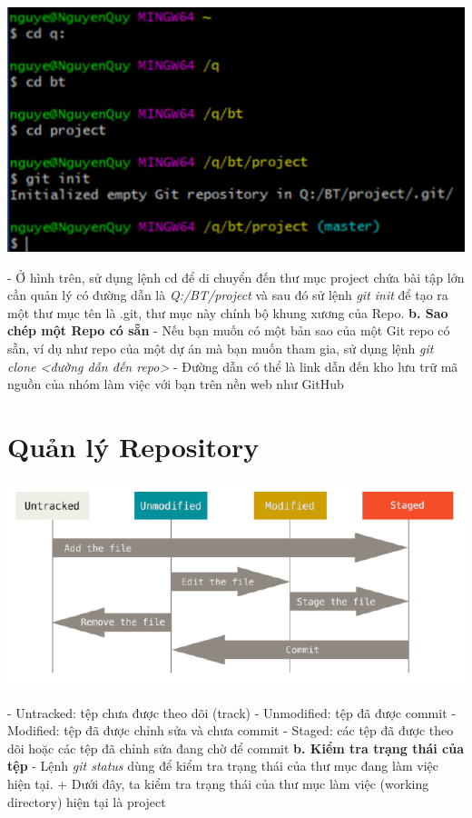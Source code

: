 \documentclass[12pt,a4paper]{report}
\begin{document}
	\includegraphics[width=0.8\linewidth]{screenshot005}

	\label{fig:screenshot005}
\vskip 0.4cm\vskip 0.4cm

- Ở hình trên, sử dụng lệnh cd để di chuyển đến thư mục project chứa bài tập lớn cần quản lý có đường dẫn là {\it Q:/BT/project} và sau đó sử lệnh {\it git init} để tạo ra một thư mục tên là .git, thư mục này chính bộ khung xương của Repo.\vskip 0.4cm
{\bf b. Sao chép một Repo có sẵn} \vskip 0.4cm
- Nếu bạn muốn có một bản sao của một Git repo có sẵn, ví dụ như repo của một dự án mà bạn muốn tham gia, sử dụng lệnh {\it git clone <đường dẫn đến repo>}\vskip 0.4cm
- Đường dẫn có thể là link dẫn đến kho lưu trữ mã nguồn của nhóm làm việc với bạn trên nền web như GitHub\vskip 0.4cm

\section{Quản lý Repository}

\hspace{0.6cm}{\bf a. Vòng tuần hoàn trạng thái của tệp}\vskip 0.4cm

	\includegraphics[width=0.8\linewidth]{screenshot006}
	
	\label{fig:screenshot006}
\vskip 0.4cm\vskip 0.4cm
- Untracked: tệp chưa được theo dõi (track)\vskip 0.4cm
- Unmodified: tệp đã được commit\vskip 0.4cm
- Modified: tệp đã được chỉnh sửa và chưa commit\vskip 0.4cm
- Staged: các tệp đã được theo dõi hoặc các tệp đã chỉnh sửa đang chờ để commit\vskip 0.4cm
{\bf b. Kiểm tra trạng thái của tệp} \vskip 0.4cm
- Lệnh \textit{git status} dùng để kiểm tra trạng thái của thư mục đang làm việc hiện tại.\vskip 0.4cm
+ Dưới đây, ta kiểm tra trạng thái của thư mục làm việc (working directory) hiện tại là project\vskip 0.4cm
\end{document}
